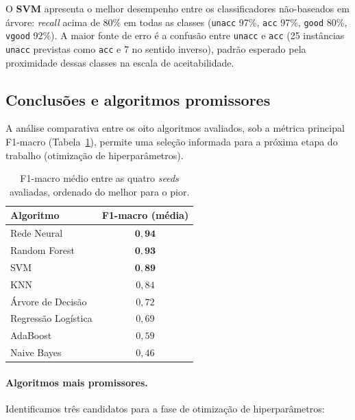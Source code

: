 \documentclass[11pt,a4paper]{article}
\newcommand{\code}[1]{\texttt{\small #1}}
\begin{document}
O \textbf{SVM} apresenta o melhor desempenho entre os classificadores não-baseados em árvore: \textit{recall} acima de 80\% em todas as classes (\code{unacc} 97\%, \code{acc} 97\%, \code{good} 80\%, \code{vgood} 92\%). A maior fonte de erro é a confusão entre \code{unacc} e \code{acc} (25 instâncias \code{unacc} previstas como \code{acc} e 7 no sentido inverso), padrão esperado pela proximidade dessas classes na escala de aceitabilidade.

\subsection{Conclusões e algoritmos promissores}

A análise comparativa entre os oito algoritmos avaliados, sob a métrica principal F1-macro (Tabela~\ref{tab:f1_macro_ranking}), permite uma seleção informada para a próxima etapa do trabalho (otimização de hiperparâmetros).

\begin{table}[H]
\centering
\caption{F1-macro médio entre as quatro \textit{seeds} avaliadas, ordenado do melhor para o pior.}
\label{tab:f1_macro_ranking}
\small
\begin{tabular}{lc}
\toprule
\textbf{Algoritmo} & \textbf{F1-macro (média)} \\
\midrule
Rede Neural           & $\mathbf{0{,}94}$ \\
Random Forest         & $\mathbf{0{,}93}$ \\
SVM                   & $\mathbf{0{,}89}$ \\
KNN                   & $0{,}84$ \\
Árvore de Decisão     & $0{,}72$ \\
Regressão Logística   & $0{,}69$ \\
AdaBoost              & $0{,}59$ \\
Naive Bayes           & $0{,}46$ \\
\bottomrule
\end{tabular}
\end{table}

\paragraph{Algoritmos mais promissores.} Identificamos três candidatos para a fase de otimização de hiperparâmetros:
\end{document}

